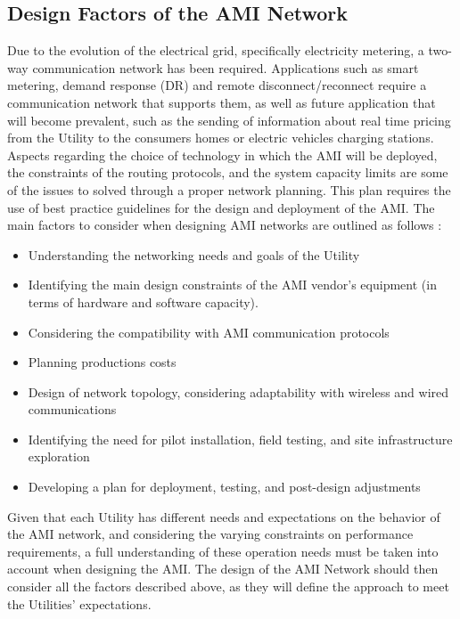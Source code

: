 \documentclass[10pt,twocolumn,twoside,submit]{JCNtran}
\begin{document}
\subsection{Design Factors of the AMI Network}\label{designFactors}

Due to the evolution of the electrical grid, specifically electricity metering, a two-way communication network has been required. Applications such as smart metering, demand response (DR) and remote disconnect/reconnect require a communication network that supports them, as well as future application that will become prevalent, such as the sending of information about real time pricing from the Utility to the consumers homes or electric vehicles charging stations.  
Aspects regarding the choice of technology in which the AMI will be deployed, the constraints of the routing protocols, and the system capacity limits are some of the issues to solved through a proper network planning. This plan requires the use of best practice guidelines for the design and deployment of the AMI. The main factors to consider when designing AMI networks are outlined as follows \cite{Leon2011} :

\begin{itemize}
\item Understanding the networking needs and goals of the Utility
\item Identifying the main design constraints of the AMI vendor's equipment (in terms of hardware and software capacity).
\item Considering the compatibility with AMI communication protocols
\item Planning productions costs
\item Design of network topology, considering adaptability with wireless and wired communications
\item Identifying the need for pilot installation, field testing, and site infrastructure exploration
\item Developing a plan for deployment, testing, and post-design adjustments


\end{itemize}
		
Given that each Utility has different needs and expectations on the behavior of the AMI network, and considering the varying constraints on performance requirements, a full understanding of these operation needs must be taken into account when designing the AMI. The design of the AMI Network should then consider all the factors described above, as they will define the approach to meet the Utilities' expectations.
\end{document}
